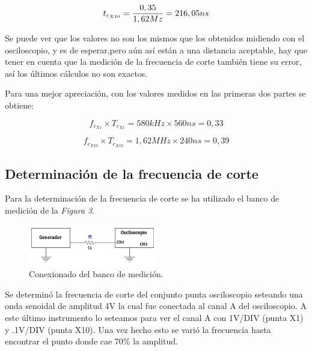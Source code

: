 \documentclass{article}
\begin{document}
\begin{equation}
t_{c_{X10}} = {0,35 \over 1,62Mz} = 216,05 ns
\end{equation}
\smallskip

Se puede ver que los valores no son los mismos que los obtenidos midiendo con el osciloscopio, y es de esperar,pero aún así están a una distancia aceptable, hay que tener en cuenta que la medición de la frecuencia de corte también tiene su error, así los últimos cálculos no son exactos.

Para una mejor apreciación, con los valores medidos en las primeras dos partes se obtiene:

\begin{equation*}
	f_{c_{X1}} \times T_{c_{X1}} = 580 kHz \times 560 ns = 0,33
\end{equation*}

\begin{equation*}
	f_{c_{X10}} \times T_{c_{X10}} = 1,62 MHz \times 240 ns = 0,39
\end{equation*}




\subsection{Determinación de la frecuencia de corte}
	
	Para la determinación de la frecuencia de corte se ha utilizado el banco de medición de la \textit{Figura 3}.
\bigskip\bigskip


\begin{figure}[h]
	\centering
	\includegraphics[width=0.50\textwidth]{images/4-3-1-circuito-banco-de-medicion.jpg}
	\medskip
	\caption{Conexionado del banco de medición.}
\end{figure}
\bigskip\bigskip

	
	Se determinó la frecuencia de corte del conjunto punta osciloscopio seteando una onda senoidal de amplitud 4V la cual fue conectada al canal A del osciloscopio. A este último instrumento lo seteamos para ver el canal A con 1V/DIV (punta X1) y .1V/DIV (punta X10). Una vez hecho esto se varió la frecuencia hasta encontrar el punto donde cae 70\% la amplitud. 
				
\end{document}
